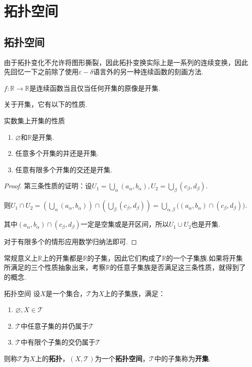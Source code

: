 \chapter{拓扑空间}

\section{拓扑空间}

由于拓扑变化不允许将图形撕裂，因此拓扑变换实际上是一系列的连续变换，因此先回忆一下之前除了使用$\varepsilon-\delta$语言外的另一种连续函数的刻画方法.

\begin{theorem}{}
    $f:\mathbb{R}\to\mathbb{R}$是连续函数当且仅当任何开集的原像是开集.
\end{theorem}

关于开集，它有以下的性质.

\begin{proposition}{实数集上开集的性质}
    \begin{enumerate}
        \item $\varnothing$和$\mathbb{R}$是开集.
        \item 任意多个开集的并还是开集.
        \item 任意有限多个开集的交还是开集.
    \end{enumerate}
\end{proposition}
\begin{proof}
    第三条性质的证明：设$U_1=\bigcup_\alpha{(a_\alpha,b_\alpha)},U_2=\bigcup_\beta{(c_\beta,d_\beta)}$.\par
    则$U_1\cap U_2=\left(\bigcup_\alpha{(a_\alpha,b_\alpha)}\right)\cap\left(\bigcup_\beta{(c_\beta,d_\beta)}\right) = \bigcup_{\alpha,\beta}\big((a_\alpha,b_\alpha)\cap(c_\beta,d_\beta)\big)$.\par
    其中$(a_\alpha,b_\alpha)\cap(c_\beta,d_\beta)$一定是空集或是开区间，所以$U_1\cup U_2$也是开集.\par
    对于有限多个的情形应用数学归纳法即可.\par
\end{proof}

常规意义上$\mathbb{R}$上的开集都是$\mathbb{R}$的子集，因此它们构成了$\mathbb{R}$的一个子集族.如果将开集所满足的三个性质抽象出来，考察$\mathbb{R}$的任意子集族是否满足这三条性质，就得到了的概念.

\begin{definition}{拓扑空间}
    设$X$是一个集合，$\mathcal{T}$为$X$上的子集族，满足：
    \begin{enumerate}
        \item $\varnothing,X\in\mathcal{T}$
        \item $\mathcal{T}$中任意子集的并仍属于$\mathcal{T}$
        \item $\mathcal{T}$中有限个子集的交仍属于$\mathcal{T}$
    \end{enumerate}
    则称$\mathcal{T}$为$X$上的\textbf{拓扑}，$(X,\mathcal{T})$为一个\textbf{拓扑空间}，$\mathcal{T}$中的子集称为\textbf{开集}.
\end{definition}

